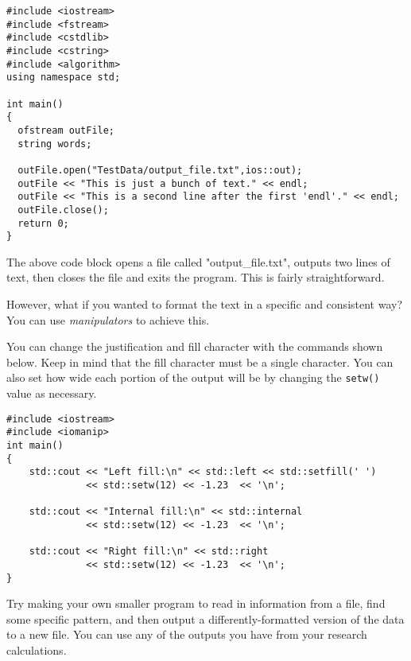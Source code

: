 \begin{verbatim}
#include <iostream>
#include <fstream>
#include <cstdlib>
#include <cstring>
#include <algorithm>
using namespace std;

int main()
{
  ofstream outFile;
  string words;
  
  outFile.open("TestData/output_file.txt",ios::out);
  outFile << "This is just a bunch of text." << endl;
  outFile << "This is a second line after the first 'endl'." << endl;
  outFile.close();
  return 0;
}
\end{verbatim}

The above code block opens a file called "output\_file.txt", outputs two lines of text, then closes the file and exits the program.  This is fairly straightforward.

However, what if you wanted to format the text in a specific and consistent way?  You can use \textit{manipulators} to achieve this.

You can change the justification and fill character with the commands shown below.  Keep in mind that the fill character must be a single character.  You can also set how wide each portion of the output will be by changing the \texttt{setw()} value as necessary.

\begin{verbatim}
#include <iostream>
#include <iomanip>
int main()
{
    std::cout << "Left fill:\n" << std::left << std::setfill(' ')
              << std::setw(12) << -1.23  << '\n';

    std::cout << "Internal fill:\n" << std::internal
              << std::setw(12) << -1.23  << '\n';

    std::cout << "Right fill:\n" << std::right
              << std::setw(12) << -1.23  << '\n';
}
\end{verbatim}

\begin{homework}
Try making your own smaller program to read in information from a file, find some specific pattern, and then output a differently-formatted version of the data to a new file.  You can use any of the outputs you have from your research calculations.
\end{homework}